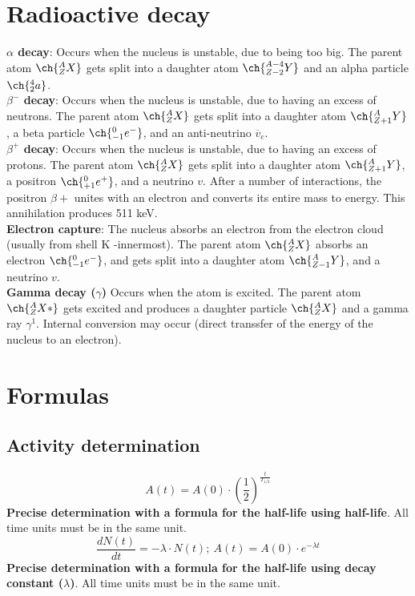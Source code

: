 \chapter{Radioactive decay}
\textbf{$\alpha$ decay}: Occurs when the nucleus is unstable, due to being too big. The parent atom $\ch{^{A}_{Z}X}$ gets split into a daughter atom $\ch{^{A-4}_{Z-2}Y}$ and an alpha particle $\ch{^{4}_{2}a}$.\\
\textbf{$\beta^{-}$ decay}: Occurs when the nucleus is unstable, due to having an excess of neutrons. The parent atom $\ch{^{A}_{Z}X}$ gets split into a daughter atom $\ch{^{A}_{Z+1}Y}$, a beta particle $\ch{^{0}_{-1}e^{-}}$, and an anti-neutrino $\overline{v}_e$.\\
\textbf{$\beta^{+}$ decay}: Occurs when the nucleus is unstable, due to having an excess of protons. The parent atom $\ch{^{A}_{Z}X}$ gets split into a daughter atom $\ch{^{A}_{Z+1}Y}$, a positron $\ch{^{0}_{+1}e^{+}}$, and a neutrino $v$. After a number of interactions, the positron $\beta{+}$ unites with an electron and converts its entire mass to energy. This annihilation produces 511 keV.\\
\textbf{Electron capture}: The nucleus absorbs an electron from the electron cloud (usually from shell K -innermost). The parent atom $\ch{^{A}_{Z}X}$ absorbs an electron $\ch{^{0}_{-1}e^{-}}$, and gets split into a daughter atom $\ch{^{A}_{Z-1}Y}$, and a neutrino $v$.\\
\textbf{Gamma decay ($\gamma$)} Occurs when the atom is excited. The parent atom $\ch{^{A}_{Z}X*}$ gets excited and produces a daughter particle $\ch{^{A}_{Z}X}$ and a gamma ray $\gamma^{1}$. Internal conversion may occur (direct transsfer of the energy of the nucleus to an electron).
\chapter{Formulas}
\section{Activity determination}
\[A(t) = A(0) \cdot (\frac{1}{2})^{\frac{t}{T_{1/2}}}\]
\textbf{Precise determination with a formula for the half-life using half-life}. All time units must be in the same unit.\\
\[\frac{dN(t)}{dt}=-\lambda\cdot N(t);\ A(t) = A(0)\cdot e^{-\lambda t}\]
\textbf{Precise determination with a formula for the half-life using decay constant ($\lambda$)}. All time units must be in the same unit.\\

